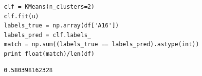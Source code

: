 \documentclass[12pt,fleqn]{article}\usepackage{../common}
\begin{document}
\begin{verbatim}
clf = KMeans(n_clusters=2)
clf.fit(u)
labels_true = np.array(df['A16'])
labels_pred = clf.labels_
match = np.sum((labels_true == labels_pred).astype(int))
print float(match)/len(df)
\end{verbatim}

\begin{verbatim}
0.580398162328
\end{verbatim}
\end{document}
